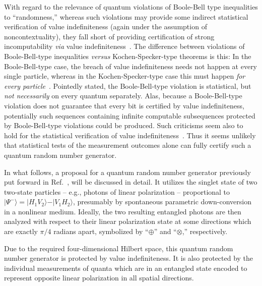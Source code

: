 \documentclass[%
 preprint,
 showpacs,
 showkeys,
 preprintnumbers,
  amsmath,amssymb,
  aps,
 pra,
  longbibliography,
  floatfix,
 ]{revtex4-1}
\theoremstyle{definition}
\begin{document}
With regard to the relevance of quantum violations of Boole-Bell type inequalities to ``randomness,''
whereas such violations may provide some indirect  statistical verification  of value indefiniteness (again under the assumption of noncontextuality),
they fall short of providing certification of strong incomputability
{\it via} value indefiniteness~\cite{2008-cal-svo,svozil-2009-howto}.
The difference between violations of Boole-Bell-type inequalities  {\it versus} Kochen-Specker-type theorems is this:
In the Boole-Bell-type case,
the breach of value indefiniteness needs not happen at every single particle,
whereas in the Kochen-Specker-type case this must happen {\em for every particle}~\cite{svozil_2010-pc09}.
Pointedly stated, the Boole-Bell-type violation is statistical, but {\em not necessarily} on every quantum separately.
Alas, because a Boole-Bell-type violation does not guarantee that every bit is certified by value indefiniteness,
potentially such sequences containing infinite computable subsequences
protected by Boole-Bell-type violations could be produced.
Such criticisms seem also to hold for the statistical verification of value indefiniteness~\cite{panbdwz,huang-2003,cabello:210401}.
Thus it seems unlikely that statistical tests of the measurement outcomes alone can fully certify such a quantum random number generator.


In what follows, a proposal for a quantum random number generator previously put forward in Ref.~\cite{svozil-2009-howto}, will be discussed in detail.
It utilizes the singlet state of two two-state particles -- e.g., photons of linear polarization -- proportional to  $\vert \Psi^- \rangle = \vert H_1 V_2\rangle - \vert V_1 H_2\rangle$,
presumably by spontaneous parametric down-conversion in a nonlinear medium.
Ideally, the two resulting entangled photons are then analyzed with respect to their linear polarization state at some directions which are exactly $\pi /4$ radians  apart,
symbolized by ``$\oplus$'' and ``$\otimes$,''
respectively.

Due to the required four-dimensional Hilbert space, this  quantum random number generator
is protected by value indefiniteness.
It is also protected by the individual measurements of quanta which are in an entangled state
encoded to represent opposite linear polarization in all spatial directions.
\end{document}
